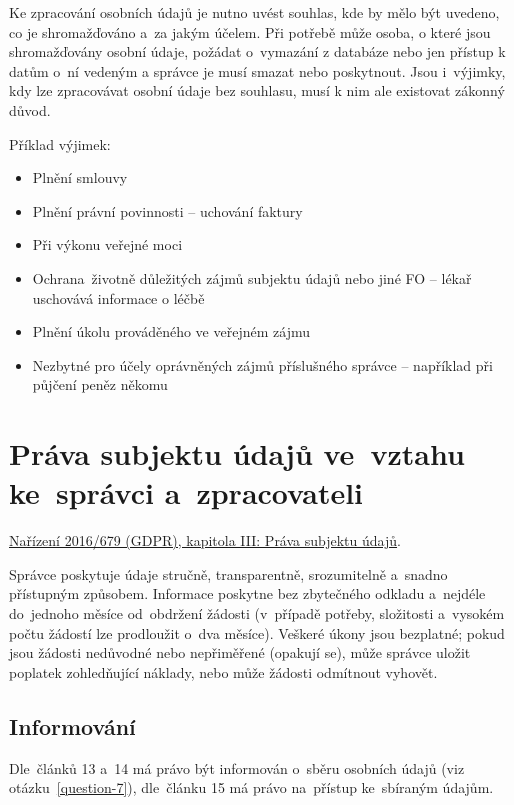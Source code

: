 Ke zpracování osobních údajů je nutno uvést souhlas, kde by mělo být uvedeno, co je shromažďováno a~za jakým účelem. Při potřebě může osoba, o které jsou shromažďovány osobní údaje, požádat o~vymazání z databáze nebo jen přístup k datům o~ní vedeným a správce je musí smazat nebo poskytnout. Jsou i~výjimky, kdy lze zpracovávat osobní údaje bez souhlasu, musí k nim ale existovat zákonný důvod.

Příklad výjimek:
\begin{itemize}[noitemsep]
    \item Plnění smlouvy
    \item Plnění právní povinnosti -- uchování faktury
    \item Při výkonu veřejné moci
    \item Ochrana~životně důležitých zájmů subjektu údajů nebo jiné FO -- lékař uschovává informace o léčbě
    \item Plnění úkolu prováděného ve veřejném zájmu
    \item Nezbytné pro účely oprávněných zájmů příslušného správce -- například při půjčení peněz někomu 
\end{itemize}



\clearpage
\section{Práva subjektu údajů ve~vztahu ke~správci a~zpracovateli}

\href{https://eur-lex.europa.eu/legal-content/CS/TXT/HTML/?uri=CELEX:32016R0679#d1e2150-1-1}{Nařízení 2016/679 (GDPR), kapitola III: Práva subjektu údajů}.

Správce poskytuje údaje stručně, transparentně, srozumitelně a~snadno přístupným způsobem. Informace poskytne bez zbytečného odkladu a~nejdéle do~jednoho měsíce od~obdržení žádosti (v~případě potřeby, složitosti a~vysokém počtu žádostí lze prodloužit o~dva měsíce). Veškeré úkony jsou bezplatné; pokud jsou žádosti nedůvodné nebo nepřiměřené (opakují se), může správce uložit poplatek zohledňující náklady, nebo může žádosti odmítnout vyhovět.

\subsection*{Informování}

Dle~článků 13 a~14 má právo být informován o~sběru osobních údajů (viz otázku~\ref{question-7}), dle~článku 15 má právo na~přístup ke~sbíraným údajům.

